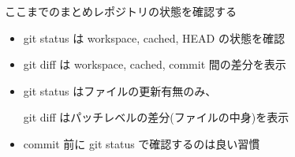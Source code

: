 
\begin{frame}[t]{ここまでのまとめ}{レポジトリの状態を確認する}

  \begin{itemize}
  \item git status は workspace, cached, HEAD の状態を確認
    \vspace{2ex}

  \item git diff は workspace, cached, commit 間の差分を表示
    \vspace{2ex}

  \item git status はファイルの更新有無のみ、

    git diff はパッチレベルの差分(ファイルの中身)を表示
    \vspace{2ex}

  \item commit 前に git status で確認するのは良い習慣
  \end{itemize}

\end{frame}
